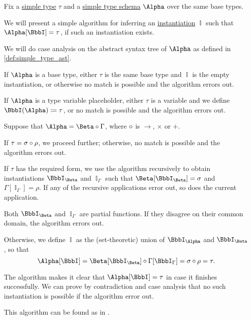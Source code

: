 \begin{algorithm}\label{alg:simple_type_schema_inference}
  Fix a \hyperref[def:simple_type]{simple type} \( \tau \) and a \hyperref[def:simple_type_schema]{simple type schema} \( \Alpha \) over the same base types.

  We will present a simple algorithm for inferring an \hyperref[def:lambda_schema_instantiation]{instantiation} \( \BbbI \) such that \( \Alpha[\BbbI] = \tau \), if such an instantiation exists.

  We will do case analysis on the abstract syntax tree of \( \Alpha \) as defined in \cref{def:simple_type_ast}.
  \begin{thmenum}
     If \( \Alpha \) is a base type, either \( \tau \) is the same base type and \( \BbbI \) is the empty instantiation, or otherwise no match is possible and the algorithm errors out.

     If \( \Alpha \) is a type variable placeholder, either \( \tau \) is a variable and we define \( \BbbI(\Alpha) \coloneqq \tau \), or no match is possible and the algorithm errors out.

     Suppose that \( \Alpha = \Beta \bincirc \Gamma \), where \( {\bincirc} \) is \( {\rightarrow} \), \( {\times} \) or \( {+} \).

    If \( \tau = \sigma \bincirc \rho \), we proceed further; otherwise, no match is possible and the algorithm errors out.

    If \( \tau \) has the required form, we use the algorithm recursively to obtain instantiations \( \BbbI_\Beta \) and \( \BbbI_\Gamma \) such that \( \Beta[\BbbI_\Beta] = \sigma \) and \( \Gamma[\BbbI_\Gamma] = \rho \). If any of the recursive applications error out, so does the current application.

    Both \( \BbbI_\Beta \) and \( \BbbI_\Gamma \) are partial functions. If they disagree on their common domain, the algorithm errors out.

    Otherwise, we define \( \BbbI \) as the (set-theoretic) union of \( \BbbI_\Alpha \) and \( \BbbI_\Beta \), so that
    \begin{equation*}
      \Alpha[\BbbI] = \Beta[\BbbI_\Beta] \bincirc \Gamma[\BbbI_\Gamma] = \sigma \bincirc \rho = \tau.
    \end{equation*}
  \end{thmenum}
\end{algorithm}
\begin{defproof}
  The algorithm makes it clear that \( \Alpha[\BbbI] = \tau \) in case it finishes successfully. We can prove by contradiction and case analysis that no such instantiation is possible if the algorithm error out.
\end{defproof}
\begin{comments}
  \item This algorithm can be found as  in \cite{notebook:code}.
\end{comments}


